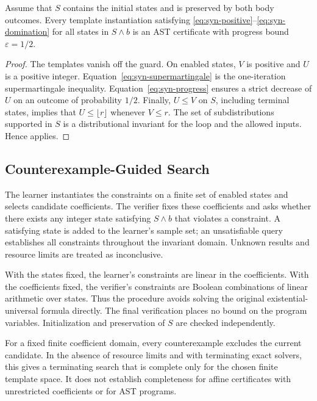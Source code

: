 \begin{proposition}
Assume that $S$ contains the initial states and is preserved by both body
outcomes. Every template instantiation satisfying
\eqref{eq:syn-positive}--\eqref{eq:syn-domination} for all states in
$S\land b$ is an AST certificate with progress bound $\varepsilon=1/2$.
\end{proposition}
\begin{proof}
The templates vanish off the guard. On enabled states, $V$ is positive and
$U$ is a positive integer. Equation~\eqref{eq:syn-supermartingale} is the
one-iteration supermartingale inequality. Equation~\eqref{eq:syn-progress}
ensures a strict decrease of $U$ on an outcome of probability $1/2$.
Finally, $U\leq V$ on $S$, including terminal states, implies that
$U\leq\lfloor r\rfloor$ whenever $V\leq r$.
The set of subdistributions supported in $S$ is a distributional invariant
for the loop and the allowed inputs. Hence  applies.
\end{proof}

\subsection{Counterexample-Guided Search}
\label{sec:synthesis-cegis}

The learner instantiates the constraints on a finite set of enabled states
and selects candidate coefficients. The verifier fixes these coefficients
and asks whether there exists any integer state satisfying $S\land b$
that violates a constraint. A satisfying state is added to the learner's
sample set; an unsatisfiable query establishes all constraints throughout
the invariant domain. Unknown results and resource limits are treated as
inconclusive.

With the states fixed, the learner's constraints are linear in the
coefficients. With the coefficients fixed, the verifier's constraints are
Boolean combinations of linear arithmetic over states. Thus the procedure
avoids solving the original existential-universal formula directly.
The final verification places no bound on the program variables.
Initialization and preservation of $S$ are checked independently.

For a fixed finite coefficient domain, every counterexample excludes the
current candidate. In the absence of resource limits and with terminating
exact solvers, this gives a terminating search that is complete only for
the chosen finite template space. It does not establish completeness for
affine certificates with unrestricted coefficients or for AST programs.

